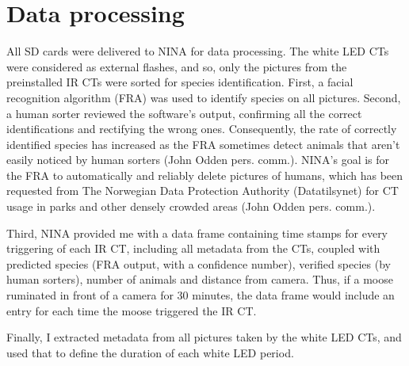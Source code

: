 









\section{Data processing} 

All SD cards were delivered to NINA for data processing.
The white LED CTs were considered as external flashes, and so, only the pictures from the preinstalled IR CTs were sorted for species identification.
First, a facial recognition algorithm (FRA) was used to identify species on all pictures. %
Second, a human sorter reviewed the software's output, confirming all the correct identifications and rectifying the wrong ones. 
Consequently, the rate of correctly identified species has increased as the FRA sometimes detect animals that aren't easily noticed by human sorters (John Odden pers. comm.). 
NINA's goal is for the FRA to automatically and reliably delete pictures of humans, which has been requested from The Norwegian Data Protection Authority (Datatilsynet) for CT usage in parks and other densely crowded areas (John Odden pers. comm.).

Third, NINA provided me with a data frame containing time stamps for every triggering of each IR CT, including all metadata from the CTs, coupled with predicted species (FRA output, with a confidence number), verified species (by human sorters), number of animals and distance from camera.
Thus, if a moose ruminated in front of a camera for 30 minutes, the data frame would include an entry for each time the moose triggered the IR CT. 

Finally, I extracted metadata from all pictures taken by the white LED CTs, %
and used that to define the duration of each white LED period.


